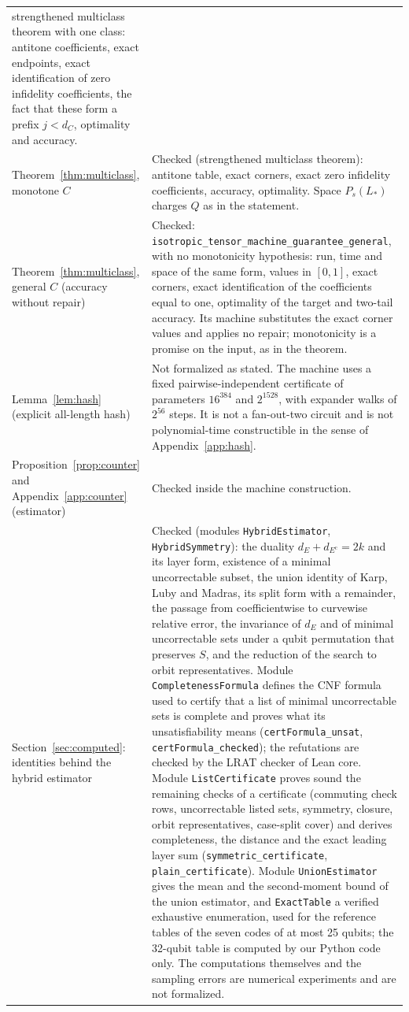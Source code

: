 \documentclass[11pt]{article}
\theoremstyle{remark}
\newcommand{\lean}[1]{\texttt{#1}}
\begin{document}
{\begin{longtable}{@{}p{}p{}@{}}
strengthened multiclass theorem with one class: antitone coefficients,
exact endpoints, exact identification of zero infidelity coefficients,
the fact that these form a prefix \(j<d_C\), optimality and accuracy.\\
Theorem~\ref{thm:multiclass}, monotone \(C\) &
Checked (strengthened multiclass theorem): antitone table, exact
corners, exact zero infidelity coefficients, accuracy, optimality.
Space \(P_s(L_*)\) charges \(Q\) as in the statement.\\
Theorem~\ref{thm:multiclass}, general \(C\) (accuracy without repair) &
Checked: \lean{isotropic\_tensor\_machine\_guarantee\_general}, with no
monotonicity hypothesis: run, time and space of the same form, values in
\([0,1]\), exact corners, exact identification of the coefficients equal
to one, optimality of the target and two-tail accuracy. Its machine
substitutes the exact corner values and applies no repair; monotonicity
is a promise on the input, as in the theorem.\\
Lemma~\ref{lem:hash} (explicit all-length hash) &
Not formalized as stated. The machine uses a fixed pairwise-independent
certificate of parameters \(16^{384}\) and \(2^{1528}\), with expander
walks of \(2^{56}\) steps. It is not a fan-out-two circuit and is not
polynomial-time constructible in the sense of Appendix~\ref{app:hash}.\\
Proposition~\ref{prop:counter} and Appendix~\ref{app:counter} (estimator) &
Checked inside the machine construction.\\
Section~\ref{sec:computed}: identities behind the hybrid estimator &
Checked (modules \lean{HybridEstimator}, \lean{HybridSymmetry}): the
duality \(d_E+d_{E^{\mathrm c}}=2k\) and its layer form, existence of a
minimal uncorrectable subset, the union identity of Karp, Luby and
Madras, its split form with a remainder, the passage from coefficientwise
to curvewise relative error, the invariance of \(d_E\) and of minimal
uncorrectable sets under a qubit permutation that preserves \(S\), and
the reduction of the search to orbit representatives. Module
\lean{CompletenessFormula} defines the CNF formula used to certify that
a list of minimal uncorrectable sets is complete and proves what its
unsatisfiability means (\lean{certFormula\_unsat},
\lean{certFormula\_checked}); the refutations are checked by the LRAT
checker of Lean core. Module \lean{ListCertificate} proves sound the
remaining checks of a certificate (commuting check rows, uncorrectable
listed sets, symmetry, closure, orbit representatives, case-split
cover) and derives completeness, the distance and the exact leading
layer sum (\lean{symmetric\_certificate}, \lean{plain\_certificate}).
Module \lean{UnionEstimator} gives the mean and the second-moment bound
of the union estimator, and \lean{ExactTable} a verified exhaustive
enumeration, used for the reference tables of the seven codes of at
most 25 qubits; the 32-qubit table is computed by our Python code only.
The computations themselves and the sampling errors are
numerical experiments and are not formalized.\\
\end{longtable}
}



\end{document}
